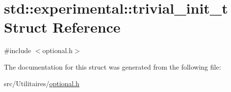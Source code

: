 \hypertarget{structstd_1_1experimental_1_1trivial__init__t}{}\section{std\+:\+:experimental\+:\+:trivial\+\_\+init\+\_\+t Struct Reference}
\label{structstd_1_1experimental_1_1trivial__init__t}


{\ttfamily \#include $<$optional.\+h$>$}



The documentation for this struct was generated from the following file\+:\begin{DoxyCompactItemize}
\item 
src/\+Utilitaires/\mbox{\hyperlink{optional_8h}{optional.\+h}}\end{DoxyCompactItemize}
